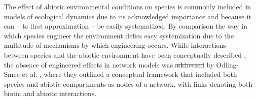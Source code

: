 \documentclass[twocolumn,preprintnumbers,amsmath,amssymb,superscriptaddress,linenumbers]{revtex4-1}
\providecommand{\DIFadd}[1]{{\protect\color{blue}\uwave{#1}}} %
\providecommand{\DIFdel}[1]{{\protect\color{red}\sout{#1}}}                      %
\providecommand{\DIFaddbegin}{} %
\providecommand{\DIFaddend}{} %
\providecommand{\DIFdelbegin}{} %
\providecommand{\DIFdelend}{} %
\newcommand{\DIFscaledelfig}{0.5}
\newlength{\DIFdelgraphicswidth} %
\newlength{\DIFdelgraphicsheight} %
\newcommand{\DIFaddincludegraphics}[2][]{{\color{blue}\fbox{\DIFOincludegraphics[#1]{#2}}}} %
\newcommand{\DIFdelincludegraphics}[2][]{%
\sbox{\DIFdelgraphicsbox}{\DIFOincludegraphics[#1]{#2}}%
\settoboxwidth{\DIFdelgraphicswidth}{\DIFdelgraphicsbox} %
\settoboxtotalheight{\DIFdelgraphicsheight}{\DIFdelgraphicsbox} %
\scalebox{\DIFscaledelfig}{%
\parbox[b]{\DIFdelgraphicswidth}{\usebox{\DIFdelgraphicsbox}\\[-\baselineskip] \rule{\DIFdelgraphicswidth}{0em}}\llap{\resizebox{\DIFdelgraphicswidth}{\DIFdelgraphicsheight}{%
\setlength{\unitlength}{\DIFdelgraphicswidth}%
\begin{picture}(1,1)%
\thicklines\linethickness{2pt} %
{\color[rgb]{1,0,0}\put(0,0){\framebox(1,1){}}}%
{\color[rgb]{1,0,0}\put(0,0){\line( 1,1){1}}}%
{\color[rgb]{1,0,0}\put(0,1){\line(1,-1){1}}}%
\end{picture}%
}\hspace*{3pt}}} %
} %
\DeclareRobustCommand{\DIFaddbegin}{\DIFOaddbegin \let\includegraphics\DIFaddincludegraphics} %
\DeclareRobustCommand{\DIFaddend}{\DIFOaddend \let\includegraphics\DIFOincludegraphics} %
\DeclareRobustCommand{\DIFdelbegin}{\DIFOdelbegin \let\includegraphics\DIFdelincludegraphics} %
\DeclareRobustCommand{\DIFdelend}{\DIFOaddend \let\includegraphics\DIFOincludegraphics} %
\begin{document}
The effect of abiotic environmental conditions on species is commonly included in models of ecological dynamics \cite{Woodward2010,Brose2012,Gibert2019b} due to its acknowledged importance and because it can -- to first approximation -- be easily systematized. 
By comparison the way in which species engineer the environment defies easy systemization due to the multitude of mechanisms by which engineering occurs.
While interactions between species and the abiotic environment have been conceptually described \cite{Olff2009,Getz2011}, the absence of engineered effects in network models was \DIFdelbegin \DIFdel{addressed }\DIFdelend \DIFaddbegin \DIFadd{described }\DIFaddend by Odling-Smee et al. \cite{OdlingSmee2013}, where they outlined a conceptual framework that included both species and abiotic compartments as nodes of a network, with links denoting both biotic and abiotic interactions.

\end{document}
